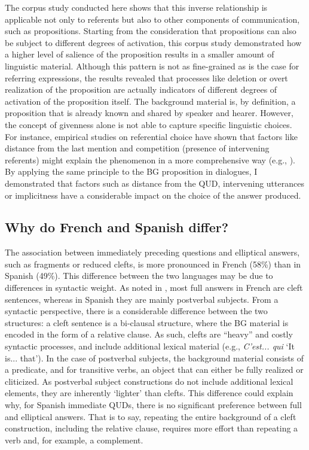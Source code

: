The corpus study conducted here shows that this inverse relationship is applicable not only to referents but also to other components of communication, such as propositions. Starting from the consideration that propositions can also be subject to different degrees of activation, this corpus study demonstrated how a higher level of salience of the proposition results in a smaller amount of linguistic material. Although this pattern is not as fine-grained as is the case for referring expressions, the results revealed that processes like deletion or overt realization of the proposition are actually indicators of different degrees of activation of the proposition itself. 
The background material is, by definition, a proposition that is already known and shared by speaker and hearer. However, the concept of givenness alone is not able to capture specific linguistic choices. For instance, empirical studies on referential choice  have shown that factors like distance from the last mention and competition (presence of intervening referents) might explain the phenomenon in a more comprehensive way (e.g., \cite{arnold2007effect}).
By applying the same principle to the BG proposition in dialogues, I demonstrated that factors such as distance from the QUD, intervening utterances or implicitness have a considerable impact on the choice of the answer produced.

\subsection{Why do French and Spanish differ?}
\label{sub:5.5.1}
The association between immediately preceding questions and elliptical answers, such as fragments or reduced clefts, is more pronounced in French (58\%) than in Spanish (49\%). This difference between the two languages may be due to differences in syntactic weight. As noted in , most full answers in French are cleft sentences, whereas in Spanish they are mainly postverbal subjects. From a syntactic perspective, there is a considerable difference between the two structures: a cleft sentence is a bi-clausal structure, where the BG material is encoded in the form of a relative clause. As such, clefts are ``heavy” and costly syntactic processes, and include additional lexical material (e.g., \textit{C'est... qui} `It is... that').
In the case of postverbal subjects, the background material consists of a predicate, and for transitive verbs, an object that can either be fully realized or cliticized. As postverbal subject constructions do not include additional lexical elements, they are inherently `lighter' than clefts. This difference could explain why, for Spanish immediate QUDs, there is no significant preference between full and elliptical answers. That is to say, repeating the entire background of a cleft construction, including the relative clause, requires more effort than repeating a verb and, for example, a complement.

